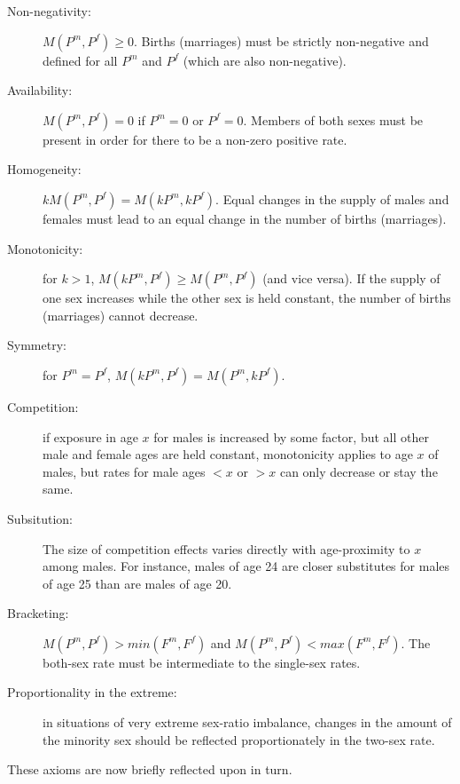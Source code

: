 \begin{description}
  \item[Non-negativity: ] $M(P^m, P^f) \ge 0$. Births (marriages) must be
  strictly non-negative and defined for all $P^m$ and $P^f$ (which are also
  non-negative).
  \item[Availability:] $M(P^m, P^f) = 0$ if $P^m = 0$ or $P^f = 0$. Members of
  both sexes must be present in order for there to be a non-zero positive rate.
  \item[Homogeneity:] $kM(P^m, P^f) = M(kP^m, kP^f)$. Equal
  changes in the supply of males and females must lead to an equal change in the
  number of births (marriages).
  \item[Monotonicity:] for $k > 1$, $M(kP^m, P^f) \ge M(P^m, P^f)$ (and vice
  versa). If the supply of one sex increases while the other sex is held constant, the number of
  births (marriages) cannot decrease.
  \item[Symmetry:] for $P^m = P^f$, $M(kP^m, P^f) = M(P^m, kP^f)$. 
  \item[Competition:] if exposure in age $x$ for males is increased by some
  factor, but all other male and female ages are held constant, monotonicity
  applies to age $x$ of males, but rates for male ages $<x$ or $>x$ can only
  decrease or stay the same. 
  \item[Subsitution:] The size of competition effects varies directly with
  age-proximity to $x$ among males. For instance, males of age 24 are closer
  substitutes for males of age 25 than are males of age 20.
  \item[Bracketing:] $M(P^m, P^f) > min(F^m, F^f)$ and $M(P^m, P^f) < max(F^m,
  F^f)$. The both-sex rate must be intermediate to the single-sex rates.
  \item[Proportionality in the extreme:] in situations of very extreme sex-ratio
  imbalance, changes in the amount of the minority sex should be reflected proportionately
  in the two-sex rate.
\end{description}
 
These axioms are now briefly reflected upon in turn.

